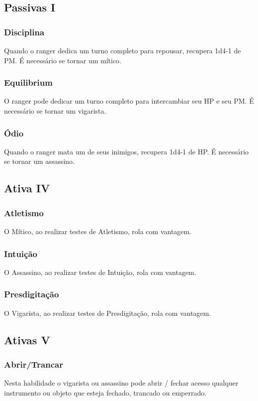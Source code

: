 \documentclass[10pt,twoside,twocolumn]{book}
\begin{document}
\subsection*{Passivas I}
\subsubsection*{Disciplina}
Quando o ranger dedica um turno completo para repousar, recupera 1d4-1 de PM. É necessário se tornar um mítico.
\subsubsection*{Equilibrium}
O ranger pode dedicar um turno completo para intercambiar seu HP e seu PM. É necessário se tornar um vigarista.
\subsubsection*{Ódio}
Quando o ranger mata um de seus inimigos, recupera 1d4-1 de HP. É necessário se tornar um assassino. 

\subsection*{Ativa IV}
\subsubsection*{Atletismo}
O Mítico, ao realizar testes de Atletismo, rola com vantagem.
\subsubsection*{Intuição}
O Assassino, ao realizar testes de Intuição, rola com vantagem.
\subsubsection*{Presdigitação}
O Vigarista, ao realizar testes de Presdigitação, rola com vantagem.

\subsection*{Ativas V}
\subsubsection*{Abrir/Trancar}
Nesta habilidade o vigarista ou assassino pode abrir / fechar acesso qualquer instrumento ou objeto que esteja fechado, trancado ou emperrado.
\end{document}
